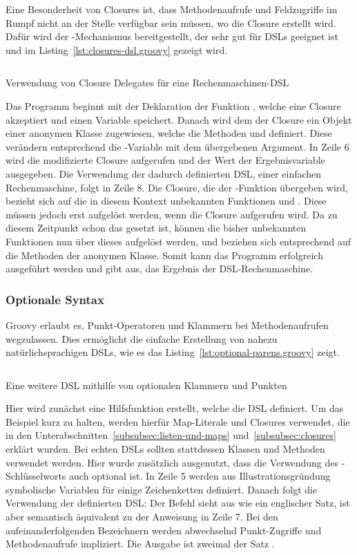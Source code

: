 \documentclass[a4paper]{article}
\newcommand{\codelisting}[3]{
\begin{listing}[ht]
	\inputminted{#1}{#1/#2}
	\vspace{-3ex}
	\caption{#3}
	\label{lst:#2}
\end{listing}
}
\begin{document}
Eine Besonderheit von Closures ist, dass Methodenaufrufe und Feldzugriffe im Rumpf nicht an der Stelle verfügbar sein müssen, wo die Closure erstellt wird.
Dafür wird der -Mechanismus bereitgestellt, der sehr gut für DSLs geeignet ist und im Listing~\ref{lst:closures-dsl.groovy} gezeigt wird.

\codelisting{groovy}{closures-dsl.groovy}{Verwendung von Closure Delegates für eine Rechenmaschinen-DSL}

Das Programm beginnt mit der Deklaration der Funktion , welche eine Closure akzeptiert und einen Variable  speichert.
Danach wird dem  der Closure ein Objekt einer anonymen Klasse zugewiesen, welche die Methoden  und  definiert.
Diese verändern entsprechend die -Variable mit dem übergebenen Argument.
In Zeile 6 wird die modifizierte Closure aufgerufen und der Wert der Ergebnisvariable ausgegeben.
Die Verwendung der dadurch definierten DSL, einer einfachen Rechenmaschine, folgt in Zeile 8.
Die Closure, die der -Funktion übergeben wird, bezieht sich auf die in diesem Kontext unbekannten Funktionen  und .
Diese müssen jedoch erst aufgelöst werden, wenn die Closure aufgerufen wird.
Da zu diesem Zeitpunkt schon das  gesetzt ist, können die bisher unbekannten Funktionen nun über dieses aufgelöst werden, und beziehen sich entsprechend auf die Methoden der anonymen Klasse.
Somit kann das Programm erfolgreich ausgeführt werden und gibt  aus, das Ergebnis der DSL-Rechenmaschine.

\subsubsection{Optionale Syntax}\label{subsubsec:optionale-syntax}

Groovy erlaubt es, Punkt-Operatoren und Klammern bei Methodenaufrufen wegzulassen.
Dies ermöglicht die einfache Erstellung von nahezu natürlichsprachigen DSLs, wie es das Listing~\ref{lst:optional-parens.groovy} zeigt.

\codelisting{groovy}{optional-parens.groovy}{Eine weitere DSL mithilfe von optionalen Klammern und Punkten}

Hier wird zunächst eine Hilfsfunktion  erstellt, welche die DSL definiert.
Um das Beispiel kurz zu halten, werden hierfür Map-Literale und Closures verwendet, die in den Unterabschnitten~\ref{subsubsec:listen-und-maps} und~\ref{subsubsec:closures} erklärt wurden.
Bei echten DSLs sollten stattdessen Klassen und Methoden verwendet werden.
Hier wurde zusätzlich ausgenutzt, dass die Verwendung des -Schlüsselworts auch optional ist.
In Zeile 5 werden aus Illustrationsgründung symbolische Variablen für einige Zeichenketten definiert.
Danach folgt die Verwendung der definierten DSL:
Der Befehl sieht aus wie ein englischer Satz, ist aber semantisch äquivalent zu der Anweisung in Zeile 7.
Bei den aufeinanderfolgenden Bezeichnern werden abwechselnd Punkt-Zugriffe und Methodenaufrufe impliziert.
Die Ausgabe ist zweimal der Satz .
\end{document}
